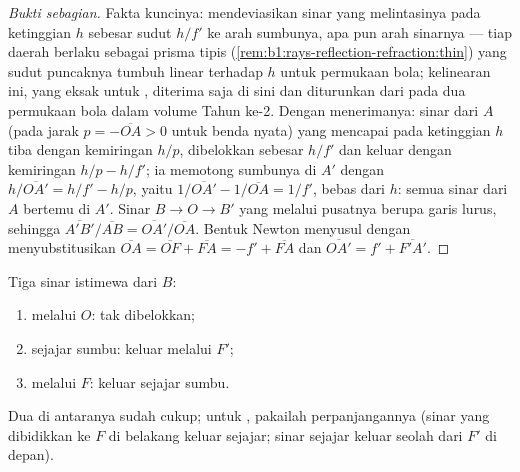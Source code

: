 \begin{proof}[Bukti sebagian]
Fakta kuncinya:  mendeviasikan sinar yang melintasinya pada
ketinggian $h$ sebesar sudut $h/f'$ ke arah sumbunya, apa pun arah
sinarnya --- tiap daerah  berlaku sebagai prisma tipis
(\cref{rem:b1:rays-reflection-refraction:thin}) yang sudut puncaknya
tumbuh linear terhadap $h$ untuk permukaan bola; kelinearan ini, yang
eksak untuk , diterima saja di sini dan diturunkan dari
 pada dua permukaan bola dalam volume Tahun ke-2. Dengan
menerimanya: sinar dari $A$ (pada jarak $p = -\overline{OA} > 0$ untuk
benda nyata) yang mencapai  pada ketinggian $h$ tiba dengan
kemiringan $h/p$, dibelokkan sebesar $h/f'$ dan keluar dengan kemiringan
$h/p - h/f'$; ia memotong sumbunya di $A'$ dengan
$h/\overline{OA'} = h/f' - h/p$, yaitu $1/\overline{OA'}
- 1/\overline{OA} = 1/f'$, bebas dari $h$: semua sinar dari $A$ bertemu
di $A'$. Sinar $B \to O \to B'$ yang melalui pusatnya berupa garis
lurus, sehingga $\overline{A'B'}/\overline{AB} = \overline{OA'}/\overline{OA}$.
Bentuk Newton menyusul dengan menyubstitusikan $\overline{OA} = \overline{OF} + \overline{FA}
= -f' + \overline{FA}$ dan $\overline{OA'} = f' + \overline{F'A'}$.
\end{proof}

\begin{method}\label{met:b1:mirrors-thin-lenses:lensrays}
Tiga sinar istimewa dari $B$:
\begin{enumerate}
  \item melalui $O$: tak dibelokkan;
  \item sejajar sumbu: keluar melalui $F'$;
  \item melalui $F$: keluar sejajar sumbu.
\end{enumerate}
Dua di antaranya sudah cukup; untuk , pakailah
perpanjangannya (sinar yang dibidikkan ke $F$ di belakang  keluar
sejajar; sinar sejajar keluar seolah dari $F'$ di depan).
\end{method}

